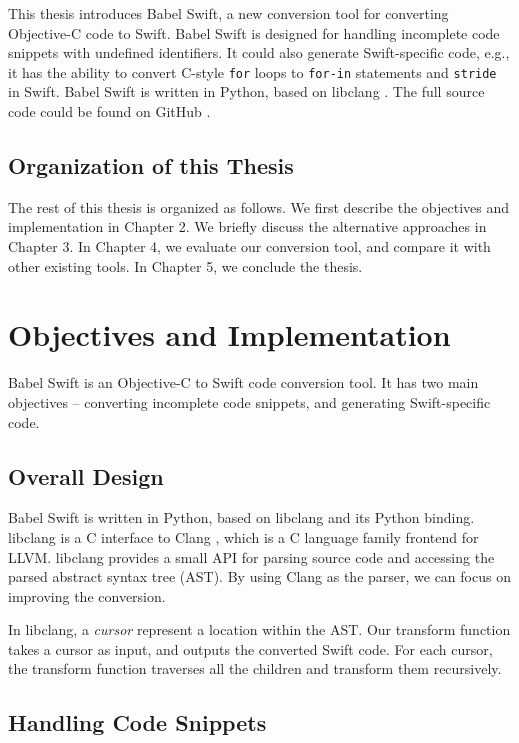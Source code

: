\documentclass{sfuthesis}
\begin{document}
This thesis introduces Babel Swift, a new conversion tool for converting Objective-C code to Swift. Babel Swift is designed for handling incomplete code snippets with undefined identifiers. It could also generate Swift-specific code, e.g., it has the ability to convert C-style \texttt{for} loops to \texttt{for-in} statements and \texttt{stride} in Swift. Babel Swift is written in Python, based on libclang \cite{libclang}. The full source code could be found on GitHub \cite{babelswift}.

\section{Organization of this Thesis}

The rest of this thesis is organized as follows. We first describe the objectives and implementation in Chapter 2. We briefly discuss the alternative approaches in Chapter 3. In Chapter 4, we evaluate our conversion tool, and compare it with other existing tools. In Chapter 5, we conclude the thesis.

\chapter{Objectives and Implementation}

Babel Swift is an Objective-C to Swift code conversion tool. It has two main objectives -- converting incomplete code snippets, and generating Swift-specific code.

\section{Overall Design}

Babel Swift is written in Python, based on libclang \cite{libclang} and its Python binding. libclang is a C interface to Clang \cite{clang}, which is a C language family frontend for LLVM. libclang provides a small API for parsing source code and accessing the parsed abstract syntax tree (AST). By using Clang as the parser, we can focus on improving the conversion.

In libclang, a \emph{cursor} represent a location within the AST. Our transform function takes a cursor as input, and outputs the converted Swift code. For each cursor, the transform function traverses all the children and transform them recursively.

\section{Handling Code Snippets}
\end{document}
